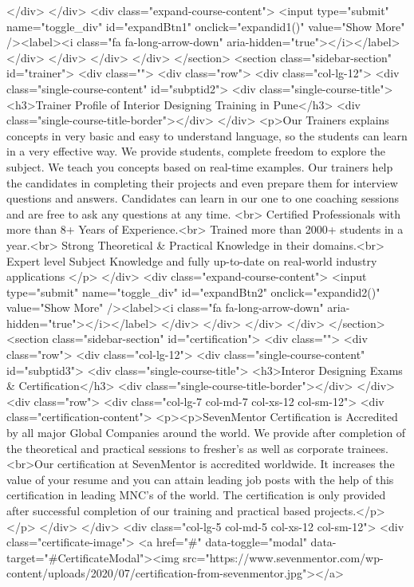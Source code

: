 {</div>
</div>
<div class="expand-course-content">
<input type="submit" name="toggle_div" id="expandBtn1" onclick="expandid1()" value="Show More" /><label><i class="fa fa-long-arrow-down" aria-hidden="true"></i></label>
</div>
</div>
</div>
</div>
</section>
<section class="sidebar-section" id="trainer">
<div class="">
<div class="row">
<div class="col-lg-12">
<div class="single-course-content" id="subptid2">
<div class="single-course-title">
<h3>Trainer Profile of Interior Designing Training in Pune</h3>
<div class="single-course-title-border"></div>
</div>
<p>Our Trainers explains concepts in very basic and easy to understand language, so the students can learn in a very effective way. We provide students, complete freedom to explore the subject. We teach you concepts based on real-time examples. Our trainers help the candidates in completing their projects and even prepare them for interview questions and answers. Candidates can learn in our one to one coaching sessions and are free to ask any questions at any time.
<br>
Certified Professionals with more than 8+ Years of Experience.<br>
Trained more than 2000+ students in a year.<br>
Strong Theoretical & Practical Knowledge in their domains.<br>
Expert level Subject Knowledge and fully up-to-date on real-world industry applications
</p>
</div>
<div class="expand-course-content">
<input type="submit" name="toggle_div" id="expandBtn2" onclick="expandid2()" value="Show More" /><label><i class="fa fa-long-arrow-down" aria-hidden="true"></i></label>
</div>
</div>
</div>
</div>
</section>
<section class="sidebar-section" id="certification">
<div class="">
<div class="row">
<div class="col-lg-12">
<div class="single-course-content" id="subptid3">
<div class="single-course-title">
<h3>Interor Designing Exams & Certification</h3>
<div class="single-course-title-border"></div>
</div>
<div class="row">
<div class="col-lg-7 col-md-7 col-xs-12 col-sm-12">
<div class="certification-content">
<p><p>SevenMentor Certification is Accredited by all major Global Companies around the world. We provide after completion of the theoretical and practical sessions to fresher’s as well as corporate trainees.<br>Our certification at SevenMentor is accredited worldwide. It increases the value of your resume and you can attain leading job posts with the help of this certification in leading MNC’s of the world. The certification is only provided after successful completion of our training and practical based projects.</p></p>
</div>
</div>
<div class="col-lg-5 col-md-5 col-xs-12 col-sm-12">
<div class="certificate-image">
<a href="#" data-toggle="modal" data-target="#CertificateModal"><img src="https://www.sevenmentor.com/wp-content/uploads/2020/07/certification-from-sevenmentor.jpg"></a>
}
